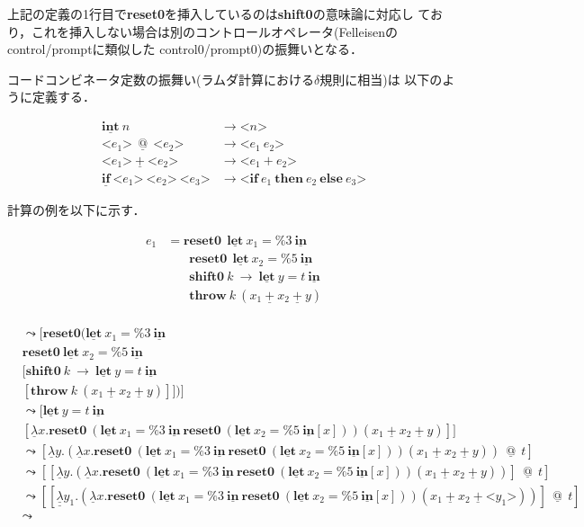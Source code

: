 \documentclass[T]{compsoft}
\makeatletter
\newcommand\Resetz{\textbf{reset0}}
\newcommand\Shiftz{\textbf{shift0}}
\newcommand\Throw{\textbf{throw}}
\newcommand\cfun[2]{\underline{\lambda}{#1}.{#2}}
\newcommand\ccfun[2]{\underline{\underline{\lambda}}{#1}.{#2}}
\newcommand\cPlus{\underline{\textbf{+}}}
\newcommand\cLet{\underline{\textbf{let}}}
\newcommand\cIn{\underline{\textbf{in}}}
\newcommand\csp[1]{\texttt{\%}{#1}}
\newcommand\cint{\underline{\textbf{int}}}
\newcommand\code[1]{\texttt{<}{#1}\texttt{>}}
\newcommand\ift[3]{\textbf{if}~{#1}~\textbf{then}~{#2}~\textbf{else}~{#3}}
\newcommand\cif[3]{\underline{\textbf{if}}~\code{{#1}}~\code{{#2}}~\code{{#3}}}
\newcommand\lto{\leadsto}
\newcommand\cat{~\underline{@}~}
\theoremstyle{break}
\makeatother
\begin{document}
上記の定義の1行目で\Resetz を挿入しているのは{\Shiftz}の意味論に対応し
ており，これを挿入しない場合は別のコントロールオペレータ(Felleisenの
control/promptに類似した control0/prompt0)の振舞いとなる．

コードコンビネータ定数の振舞い(ラムダ計算における$\delta$規則に相当)は
以下のように定義する．

\begin{align*}
  \cint~ n &\to \code{n} \\
  \code{e_1}~ \cat~ \code{e_2} &\to \code{e_1~ e_2} \\
  \code{e_1}~ \cPlus~ \code{e_2} &\to \code{e_1 + e_2} \\
  \cif{e_1}{e_2}{e_3} &\to \code{\ift{e_1}{e_2}{e_3}}
\end{align*}

計算の例を以下に示す．

\begin{align*}
  e_1 & = \Resetz ~~\cLet~x_1=\csp{3}~\cIn \\
      & \phantom{=}~~ \Resetz ~~\cLet~x_2=\csp{5}~\cIn \\
      & \phantom{=}~~ \Shiftz~k~\to~\cLet~y=t~\cIn \\
      & \phantom{=}~~ \Throw~ k~ (x_1~\cPlus~x_2~\cPlus~y) \\
\end{align*}

\begin{align*}
  [ e_1 ] &\lto [ \Resetz (\cLet~x_1=\csp{3}~\cIn \\
          &\Resetz~ \cLet~x_2=\csp{5}~\cIn \\
          &[ \Shiftz~ k~ \to~ \cLet~ y=t~ \cIn \\
          &[ \Throw~ k~(x_1~\cPlus~x_2~\cPlus~y) ] ] ) ] \\
          &\lto [ \cLet~ y=t~ \cIn \\
          &[ \cfun{x}{\Resetz~ (\cLet~x_1=\csp{3}~ \cIn~ \Resetz~ (\cLet~ x_2=\csp{5}~ \cIn [x]))} (x_1~\cPlus~x_2~\cPlus~y) ]] \\
          &\lto [ \cfun{y}{(\cfun{x}{\Resetz~ (\cLet~x_1=\csp{3}~ \cIn~ \Resetz~ (\cLet~ x_2=\csp{5}~ \cIn [x]))} (x_1~\cPlus~x_2~\cPlus~y))}~ \cat~ t ] \\
          &\lto [[\cfun{y}{(\cfun{x}{\Resetz~ (\cLet~x_1=\csp{3}~ \cIn~ \Resetz~ (\cLet~ x_2=\csp{5}~ \cIn [x]))} (x_1~\cPlus~x_2~\cPlus~y))}]~ \cat~ t] \\
          &\lto [[\ccfun{y_1}{(\cfun{x}{\Resetz~ (\cLet~x_1=\csp{3}~ \cIn~ \Resetz~ (\cLet~ x_2=\csp{5}~ \cIn [x]))} (x_1~\cPlus~x_2~\cPlus~ \code{y_1}))}]~ \cat~ t] \\
          &\lto
\end{align*}
\end{document}
